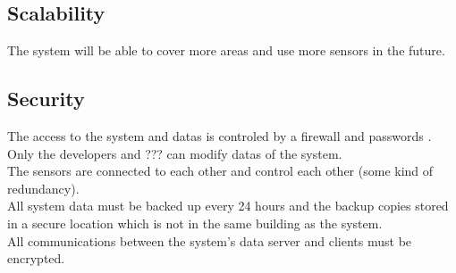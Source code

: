 \subsection{Scalability}
The system will be able to cover more areas and use more sensors in the future.

\subsection{Security}
The access to the system and datas is controled by a firewall and passwords .\\
Only the developers and ??? can modify datas of the system.\\
The sensors are connected to each other and control each other (some kind of redundancy).\\
All system data must be backed up every 24 hours and the backup copies stored in a secure location which is not in the same building as the system.\\
All communications between the system’s data server and clients must be encrypted.\\




